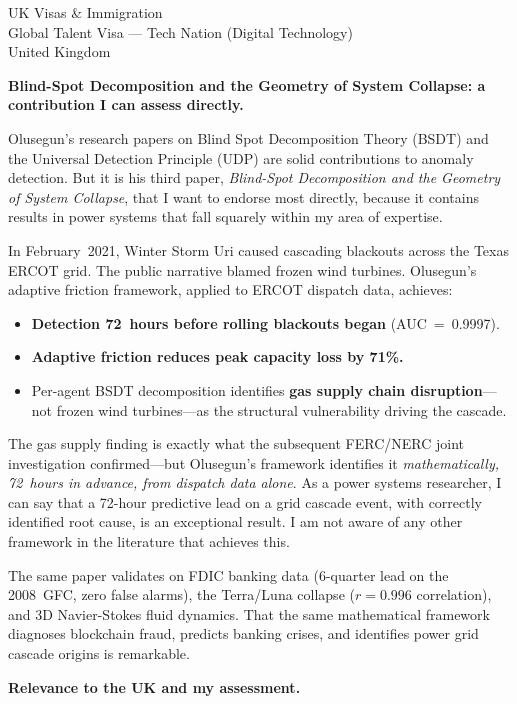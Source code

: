 \documentclass[12pt,a4paper]{letter}
\begin{document}
\begin{letter}{UK Visas \& Immigration\\
Global Talent Visa --- Tech Nation (Digital Technology)\\
United Kingdom}

\textbf{Blind-Spot Decomposition and the Geometry of System Collapse: a
contribution I can assess directly.}

Olusegun's research papers on Blind Spot Decomposition Theory (BSDT) and
the Universal Detection Principle (UDP) are solid contributions to
anomaly detection.  But it is his third paper, \textit{Blind-Spot
Decomposition and the Geometry of System Collapse}, that I want to
endorse most directly, because it contains results in power systems that
fall squarely within my area of expertise.

In February~2021, Winter Storm Uri caused cascading blackouts across the
Texas ERCOT grid.  The public narrative blamed frozen wind turbines.
Olusegun's adaptive friction framework, applied to ERCOT dispatch data,
achieves:

\begin{itemize}
  \item \textbf{Detection 72~hours before rolling blackouts began}
    (AUC~=~0.9997).
  \item \textbf{Adaptive friction reduces peak capacity loss by 71\%.}
  \item Per-agent BSDT decomposition identifies \textbf{gas supply
    chain disruption}---not frozen wind turbines---as the structural
    vulnerability driving the cascade.
\end{itemize}

The gas supply finding is exactly what the subsequent FERC/NERC joint
investigation confirmed---but Olusegun's framework identifies it
\textit{mathematically, 72~hours in advance, from dispatch data alone}.
As a power systems researcher, I can say that a 72-hour predictive lead
on a grid cascade event, with correctly identified root cause, is an
exceptional result.  I am not aware of any other framework in the
literature that achieves this.

The same paper validates on FDIC banking data (6-quarter lead on the
2008~GFC, zero false alarms), the Terra/Luna collapse ($r = 0.996$
correlation), and 3D Navier-Stokes fluid dynamics.  That the same
mathematical framework diagnoses blockchain fraud, predicts banking
crises, and identifies power grid cascade origins is remarkable.


\textbf{Relevance to the UK and my assessment.}


\end{letter}
\end{document}
